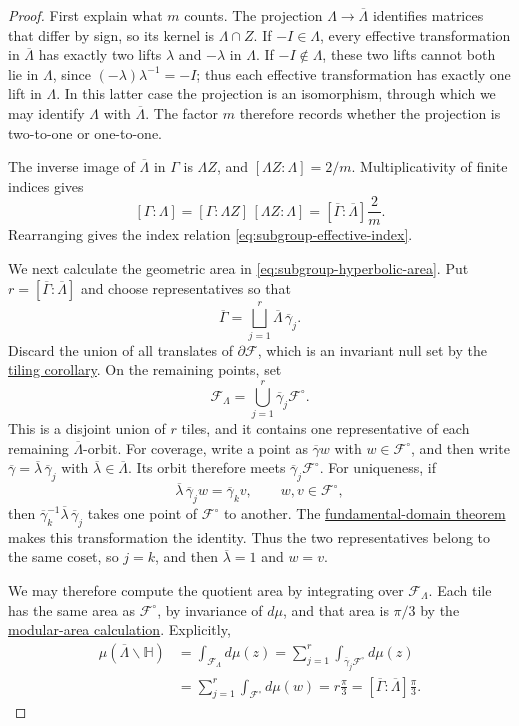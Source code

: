 \begin{proof}
First explain what $m$ counts. The projection $\Lambda\to\overline\Lambda$ identifies matrices that differ by sign, so its kernel is $\Lambda\cap Z$. If $-I\in\Lambda$, every effective transformation in $\overline\Lambda$ has exactly two lifts $\lambda$ and $-\lambda$ in $\Lambda$. If $-I\notin\Lambda$, these two lifts cannot both lie in $\Lambda$, since $(-\lambda)\lambda^{-1}=-I$; thus each effective transformation has exactly one lift in $\Lambda$. In this latter case the projection is an isomorphism, through which we may identify $\Lambda$ with $\overline\Lambda$. The factor $m$ therefore records whether the projection is two-to-one or one-to-one.

The inverse image of $\overline\Lambda$ in $\Gamma$ is $\Lambda Z$, and $[\Lambda Z:\Lambda]=2/m$. Multiplicativity of finite indices gives
\[
 [\Gamma:\Lambda]=[\Gamma:\Lambda Z]\,[\Lambda Z:\Lambda]
 =[\overline\Gamma:\overline\Lambda]\frac2m.
\]
Rearranging gives the index relation \eqref{eq:subgroup-effective-index}.

We next calculate the geometric area in \eqref{eq:subgroup-hyperbolic-area}. Put $r=[\overline\Gamma:\overline\Lambda]$ and choose representatives so that
\[
 \overline\Gamma=\bigsqcup_{j=1}^{r}\overline\Lambda\,\overline\gamma_j.
\]
Discard the union of all translates of $\partial\mathcal F$, which is an invariant null set by the \hyperref[modular.tiling]{tiling corollary}. On the remaining points, set
\[
 \mathcal F_\Lambda=\bigcup_{j=1}^{r}\overline\gamma_j\mathcal F^\circ.
\]
This is a disjoint union of $r$ tiles, and it contains one representative of each remaining $\overline\Lambda$-orbit. For coverage, write a point as $\overline\gamma w$ with $w\in\mathcal F^\circ$, and then write $\overline\gamma=\overline\lambda\,\overline\gamma_j$ with $\overline\lambda\in\overline\Lambda$. Its orbit therefore meets $\overline\gamma_j\mathcal F^\circ$. For uniqueness, if
\[
 \overline\lambda\,\overline\gamma_j w=\overline\gamma_k v,
 \qquad w,v\in\mathcal F^\circ,
\]
then $\overline\gamma_k^{-1}\overline\lambda\,\overline\gamma_j$ takes one point of $\mathcal F^\circ$ to another. The \hyperref[modular.fundamental-domain]{fundamental-domain theorem} makes this transformation the identity. Thus the two representatives belong to the same coset, so $j=k$, and then $\overline\lambda=1$ and $w=v$.

We may therefore compute the quotient area by integrating over $\mathcal F_\Lambda$. Each tile has the same area as $\mathcal F^\circ$, by invariance of $d\mu$, and that area is $\pi/3$ by the \hyperref[modular.quotient-area]{modular-area calculation}. Explicitly,
\[
 \begin{aligned}
 \mu(\overline\Lambda\backslash\mathbb H)
 &=\int_{\mathcal F_\Lambda}d\mu(z)
 =\sum_{j=1}^{r}\int_{\overline\gamma_j\mathcal F^\circ}d\mu(z)\\
 &=\sum_{j=1}^{r}\int_{\mathcal F^\circ}d\mu(w)
 =r\frac\pi3
 =[\overline\Gamma:\overline\Lambda]\frac\pi3.
 \end{aligned}
\]


\end{proof}
